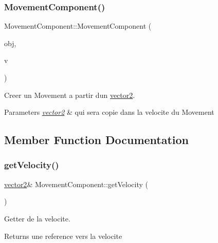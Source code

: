\subsubsection{\texorpdfstring{Movement\+Component()}{MovementComponent()}\hspace{0.1cm}{\footnotesize\ttfamily [2/2]}}
{\footnotesize\ttfamily Movement\+Component\+::\+Movement\+Component (\begin{DoxyParamCaption}\item[{\hyperlink{class_game_object}{Game\+Object} $\ast$}]{obj,  }\item[{\hyperlink{structvector2}{vector2}}]{v }\end{DoxyParamCaption})\hspace{0.3cm}{\ttfamily [inline]}}



Creer un Movement a partir d\textquotesingle{}un \hyperlink{structvector2}{vector2}. 


\begin{DoxyParams}{Parameters}
{\em \hyperlink{structvector2}{vector2}} & qui sera copie dans la velocite du Movement \\
\hline
\end{DoxyParams}


\subsection{Member Function Documentation}
\hypertarget{class_movement_component_a1b3cc0445b34ceafb79d694ecafbcd2c}{}\label{class_movement_component_a1b3cc0445b34ceafb79d694ecafbcd2c} 
\subsubsection{\texorpdfstring{get\+Velocity()}{getVelocity()}}
{\footnotesize\ttfamily \hyperlink{structvector2}{vector2}\& Movement\+Component\+::get\+Velocity (\begin{DoxyParamCaption}{ }\end{DoxyParamCaption})\hspace{0.3cm}{\ttfamily [inline]}}



Getter de la velocite. 

\begin{DoxyReturn}{Returns}
une reference vers la velocite 
\end{DoxyReturn}
\hypertarget{class_movement_component_a713784d4a7ccca4e4ad946f73d2db6cd}{}\label{class_movement_component_a713784d4a7ccca4e4ad946f73d2db6cd} 
